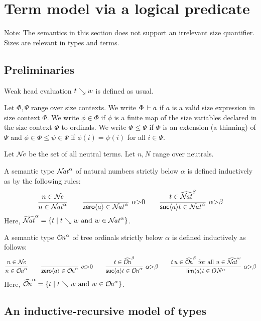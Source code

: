 \documentclass[acmsmall,screen]{acmart}\settopmatter{}
\begin{document}
\section{Term model via a logical predicate}

Note: The semantics in this section does not support an irrelevant
size quantifier.  Sizes are relevant in types and terms.

\subsection{Preliminaries}

Weak head evaluation $t \searrow w$ is defined as usual.

Let $\Phi,\Psi$ range over size contexts.  We write $\Phi \,\vdash a$ if
$a$ is a valid size expression in size context $\Phi$.
We write $\phi \in \Phi$ if $\phi$ is a finite map of the
size variables declared in the size context $\Phi$ to ordinals.
We write $\Phi \leq \Psi$ if $\Phi$ is an extension (a thinning) of
$\Psi$ and $\phi \in \Phi \leq \psi \in \Psi$ if $\phi(i) = \psi(i)$
for all $i \in \Psi$.

Let $\mathcal{N}\!\mathit{e}$ be the set of all neutral terms.  Let $n,N$ range over neutrals.

A semantic type ${\mathcal{N}\!\mathit{at}}^\alpha$ of natural numbers
strictly below $\alpha$ is defined inductively as by the following
rules:
\[
  \ru{n \in \NE
    }{n \in \NAT^\alpha}
\qquad
  \rux{
     }{\zero a \in \NAT^{\alpha}
     }{\alpha {>} 0}
\qquad
  \rux{t \in \NAThat^{\beta}
     }{\suc a t \in \NAT^{\alpha}
     }{\alpha {>} \beta}
\]
Here,
$\widehat{\mathcal{N}\!\mathit{at}}^\alpha = \{ t \mid t \searrow w \ \mbox{and}\  w \in {\mathcal{N}\!\mathit{at}}^\alpha \}$.

A semantic type ${\mathcal{O}\!\mathit{n}}^\alpha$ of tree ordinals strictly below $\alpha$
is defined inductively as follows:
\[
  \ru{n \in \NE
    }{n \in \ON^\alpha}
\qquad
  \rux{
     }{\zero a \in \ON^{\alpha}
     }{\alpha {>} 0}
\qquad
  \rux{t \in \ONhat^{\beta}
     }{\suc a t \in \ON^{\alpha}
     }{\alpha {>} \beta}
\qquad
  \rux{t\,u \in \ONhat^{\beta} \mforall u \in \NAThat^\omega
     }{\lim a t \in ON^{\alpha}
     }{\alpha{>}\beta}
\]
Here,
$\widehat{{\mathcal{O}\!\mathit{n}}}^\alpha = \{ t \mid t \searrow w \ \mbox{and}\  w \in {\mathcal{O}\!\mathit{n}}^\alpha \}$.

\subsection{An inductive-recursive model of types}
\end{document}
